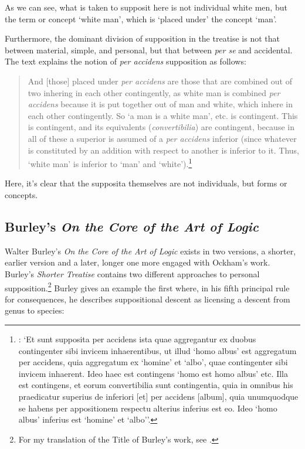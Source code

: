 \documentclass[a4paper, 11pt]{article}
\begin{document}
As we can see, what is taken to supposit here is not individual white men, but the term or concept `white man', which is `placed under' the concept `man'. 

Furthermore, the dominant division of supposition in the treatise is not that between material, simple, and personal, but that between \emph{per se} and accidental. The text explains the notion of \emph{per accidens} supposition as follows:

\begin{quote}
And [those] placed under \emph{per accidens} are those that are combined out of two inhering in each other contingently, as white man is combined \emph{per accidens} because it is put together out of man and white, which inhere in each other contingently. So `a man is a white man', etc. is contingent. This is contingent, and its equivalents (\emph{convertibilia}) are contingent, because in all of these a superior is assumed of a \emph{per accidens} inferior (since whatever is constituted by an addition with respect to another is inferior to it. Thus, `white man' is inferior to `man' and `white').\footnote{\autocite[19, par. 38]{Green-Pedersen1980a}: `Et sunt supposita per accidens ista quae aggregantur ex duobus contingenter sibi invicem inhaerentibus, ut illud `homo albus' est aggregatum per accidens, quia aggregatum ex `homine' et `albo', quae contingenter sibi invicem inhaerent. Ideo haec est contingens `homo est homo albus' etc. Illa est contingens, et eorum convertibilia sunt contingentia, quia in omnibus his praedicatur superius de inferiori [et] per accidens [album], quia unumquodque se habens per appositionem respectu alterius inferius est eo. Ideo `homo albus' inferius est `homine' et `albo''.}
\end{quote}

Here, it's clear that the supposita themselves are not individuals, but forms or concepts.

\subsection{Burley's \emph{On the Core of the Art of Logic}}
Walter Burley's \emph{On the Core of the Art of Logic} exists in two versions, a shorter, earlier version and a later, longer one more engaged with Ockham's work. Burley's \emph{Shorter Treatise} contains two different approaches to personal supposition.\footnote{For my translation of the Title of Burley's work, see \autocite{SpadeMenn}.} Burley gives an example the first where, in his fifth principal rule for consequences, he describes suppositional descent as licensing a descent from genus to species:
\end{document}
